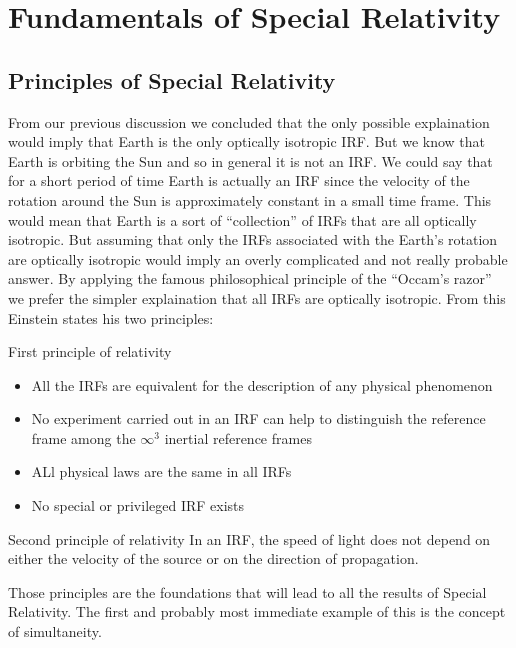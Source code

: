 \chapter[SR Fundamentals]{Fundamentals of Special Relativity}
\section{Principles of Special Relativity}
From our previous discussion we concluded that the only possible explaination would imply that Earth is the only optically isotropic IRF. But we know that Earth is orbiting the Sun and so in general it is not an IRF. We could say that for a short period of time Earth is actually an IRF since the velocity of the rotation around the Sun is approximately constant in a small time frame. This would mean that Earth is a sort of ``collection'' of IRFs that are all optically isotropic. But assuming that only the IRFs associated with the Earth's rotation are optically isotropic would imply an overly complicated and not really probable answer. By applying the famous philosophical principle of the ``Occam's razor'' we prefer the simpler explaination that all IRFs are optically isotropic.
From this Einstein states his two principles:
\begin{theorem}{First principle of relativity}
  \begin{itemize}
    \item All the IRFs are equivalent for the description of any physical phenomenon
    \item No experiment carried out in an IRF can help to distinguish the reference frame among the $\infty^3$ inertial reference frames
    \item ALl physical laws are the same in all IRFs
    \item No special or privileged IRF exists
  \end{itemize}
\end{theorem}
\begin{theorem}{Second principle of relativity}
  In an IRF, the speed of light does not depend on either the velocity of the source or on the direction of propagation.
\end{theorem}
Those principles are the foundations that will lead to all the results of Special Relativity. The first and probably most immediate example of this is the concept of simultaneity.

